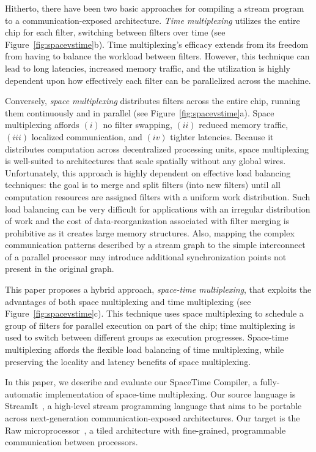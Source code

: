 Hitherto, there have been two basic approaches for compiling a stream
program to a communication-exposed architecture.  {\it Time
multiplexing} utilizes the entire chip for each filter, switching
between filters over time (see Figure~\ref{fig:spacevstime}b).  Time
multiplexing's efficacy extends from its freedom from having to
balance the workload between filters.  However, this technique can
lead to long latencies, increased memory traffic, and the utilization
is highly dependent upon how effectively each filter can be
parallelized across the machine.

Conversely, {\it space multiplexing} distributes filters across the
entire chip, running them continuously and in parallel (see
Figure~\ref{fig:spacevstime}a).  Space multiplexing affords $(i)$ no
filter swapping, $(ii)$ reduced memory traffic, $(iii)$ localized
communication, and $(iv)$ tighter latencies.  Because it distributes
computation across decentralized processing units, space multiplexing
is well-suited to architectures that scale spatially without any
global wires.  Unfortunately, this approach is highly dependent on
effective load balancing techniques: the goal is to merge and split
filters (into new filters) until all computation resources are
assigned filters with a uniform work distribution.  Such load
balancing can be very difficult for applications with an irregular
distribution of work and the cost of data-reorganization associated
with filter merging is prohibitive as it creates large memory
structures. Also, mapping the complex communication patterns described
by a stream graph to the simple interconnect of a parallel processor
may introduce additional synchronization points not present in the
original graph.

This paper proposes a hybrid approach, {\it space-time multiplexing},
that exploits the advantages of both space multiplexing and time
multiplexing (see Figure~\ref{fig:spacevstime}c).  This technique uses
space multiplexing to schedule a group of filters for parallel
execution on part of the chip; time multiplexing is used to
switch between different groups as execution progresses.  Space-time
multiplexing affords the flexible load balancing of time multiplexing,
while preserving the locality and latency benefits of space
multiplexing.

In this paper, we describe and evaluate our SpaceTime Compiler, a
fully-automatic implementation of space-time multiplexing.  Our source
language is StreamIt~\cite{streamitcc}, a high-level stream
programming language that aims to be portable across next-generation
communication-exposed architectures.  Our target is the Raw
microprocessor~\cite{raw10,raw_isca}, a tiled architecture with
fine-grained, programmable communication between processors.

